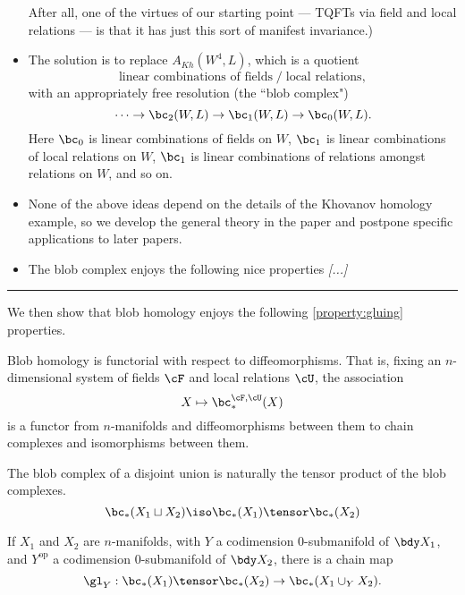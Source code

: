 \documentclass[11pt,leqno]{amsart}
\def\du{\sqcup}
\def\nn#1{{{\it \small [#1]}}}
\begin{document}
\begin{itemize}
After all, one of the virtues of our starting point --- TQFTs via field and local relations ---
is that it has just this sort of manifest invariance.)
\item The solution is to replace $A_{Kh}(W^4, L)$, which is a quotient
\[
 \text{linear combinations of fields} \;\big/\; \text{local relations} ,
\]
with an appropriately free resolution (the ``blob complex")
\[
	\cdots\to \bc_2(W, L) \to \bc_1(W, L) \to \bc_0(W, L) .
\]
Here $\bc_0$ is linear combinations of fields on $W$,
$\bc_1$ is linear combinations of local relations on $W$,
$\bc_1$ is linear combinations of relations amongst relations on $W$,
and so on.
\item None of the above ideas depend on the details of the Khovanov homology example,
so we develop the general theory in the paper and postpone specific applications
to later papers.
\item The blob complex enjoys the following nice properties \nn{...}
\end{itemize}

\bigskip
\hrule
\bigskip

We then show that blob homology enjoys the following
\ref{property:gluing} properties.

\begin{property}[Functoriality]
\label{property:functoriality}%
Blob homology is functorial with respect to diffeomorphisms. That is, fixing an $n$-dimensional system of fields $\cF$ and local relations $\cU$, the association
\begin{equation*}
X \mapsto \bc_*^{\cF,\cU}(X)
\end{equation*}
is a functor from $n$-manifolds and diffeomorphisms between them to chain complexes and isomorphisms between them.
\end{property}

\begin{property}
\label{property:disjoint-union}
The blob complex of a disjoint union is naturally the tensor product of the blob complexes.
\begin{equation*}
\bc_*(X_1 \du X_2) \iso \bc_*(X_1) \tensor \bc_*(X_2)
\end{equation*}
\end{property}

\begin{property}
\label{property:gluing-map}%
If $X_1$ and $X_2$ are $n$-manifolds, with $Y$ a codimension $0$-submanifold of $\bdy X_1$, and $Y^{\text{op}}$ a codimension $0$-submanifold of $\bdy X_2$,
there is a chain map
\begin{equation*}
\gl_Y: \bc_*(X_1) \tensor \bc_*(X_2) \to \bc_*(X_1 \cup_Y X_2).
\end{equation*}
\end{property}
\end{document}
